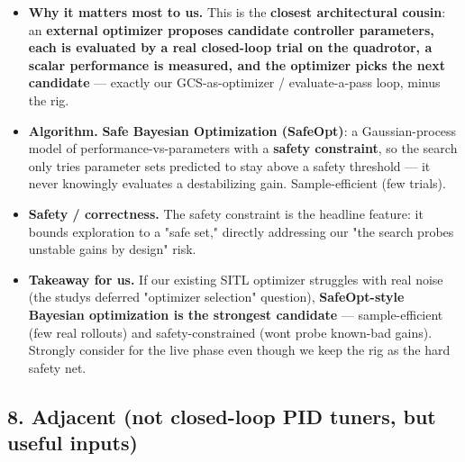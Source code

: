 \documentclass[
  11pt,
]{article}
\providecommand{\tightlist}{%
  \setlength{\itemsep}{0pt}\setlength{\parskip}{0pt}}
\begin{document}
\begin{itemize}
\tightlist
\item
  \textbf{Why it matters most to us.} This is the \textbf{closest
  architectural cousin}: an \textbf{external optimizer proposes
  candidate controller parameters, each is evaluated by a real
  closed-loop trial on the quadrotor, a scalar performance is measured,
  and the optimizer picks the next candidate} --- exactly our
  GCS-as-optimizer / evaluate-a-pass loop, minus the rig.
\item
  \textbf{Algorithm.} \textbf{Safe Bayesian Optimization (SafeOpt)}: a
  Gaussian-process model of performance-vs-parameters with a
  \textbf{safety constraint}, so the search only tries parameter sets
  predicted to stay above a safety threshold --- it never knowingly
  evaluates a destabilizing gain. Sample-efficient (few trials).
\item
  \textbf{Safety / correctness.} The safety constraint is the headline
  feature: it bounds exploration to a "safe set," directly addressing
  our "the search probes unstable gains by design" risk.
\item
  \textbf{Takeaway for us.} If our existing SITL optimizer struggles
  with real noise (the study\textquotesingle s deferred "optimizer
  selection" question), \textbf{SafeOpt-style Bayesian optimization is
  the strongest candidate} --- sample-efficient (few real rollouts) and
  safety-constrained (won\textquotesingle t probe known-bad gains).
  Strongly consider for the live phase even though we keep the rig as
  the hard safety net.
\end{itemize}

\hypertarget{8-adjacent-not-closed-loop-pid-tuners-but-useful-inputs}{%
\subsection{8. Adjacent (not closed-loop PID tuners, but useful
inputs)}\label{8-adjacent-not-closed-loop-pid-tuners-but-useful-inputs}}
\end{document}
